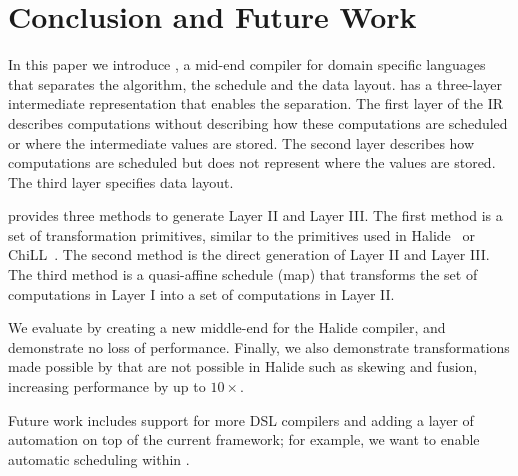 \section{Conclusion and Future Work}

In this paper we introduce \framework, a mid-end compiler for domain specific languages that separates the algorithm, the schedule and the data layout.
\framework has a three-layer intermediate representation that enables the separation.  The first layer of the IR describes computations without describing how these computations are scheduled or where the intermediate values are stored.  The second layer describes how computations are scheduled but does not represent where the values are stored.  The third layer specifies data layout.

\framework{} provides three methods to generate Layer II and Layer III.  The first method is a set of transformation primitives, similar to the primitives used in Halide~\cite{halide_12} or ChiLL~\cite{chill}. The second method is the direct generation of Layer II and Layer III.
The third method is a quasi-affine schedule (map) that transforms the set of computations in Layer I into a set of computations in Layer II.

We evaluate \framework by creating a new middle-end for the Halide compiler, and demonstrate no loss of performance.  Finally, we also demonstrate transformations made possible by \framework that are not possible in Halide such as skewing and fusion, increasing performance by up to $10\times$.

Future work includes support for more DSL compilers and adding a layer of automation on top of the current framework; for example, we want to enable automatic scheduling within \framework.